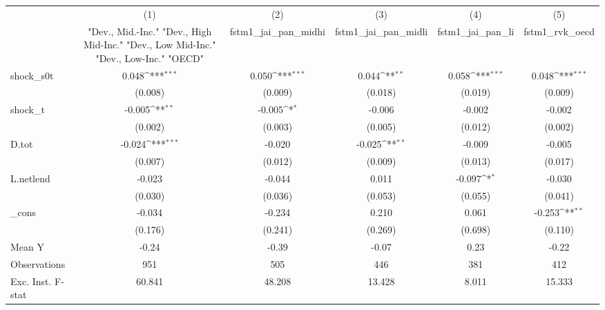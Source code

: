 {
\def\sym#1{\ifmmode^{#1}\else\(^{#1}\)\fi}
\begin{tabular}{l*{5}{c}}
\toprule
            &\multicolumn{1}{c}{(1)}&\multicolumn{1}{c}{(2)}&\multicolumn{1}{c}{(3)}&\multicolumn{1}{c}{(4)}&\multicolumn{1}{c}{(5)}\\
            &\multicolumn{1}{c}{ "Dev., Mid.-Inc." "Dev., High Mid-Inc." "Dev., Low Mid-Inc." "Dev., Low-Inc." "OECD" }&\multicolumn{1}{c}{fstm1\_jai\_pan\_midhi}&\multicolumn{1}{c}{fstm1\_jai\_pan\_midli}&\multicolumn{1}{c}{fstm1\_jai\_pan\_li}&\multicolumn{1}{c}{fstm1\_rvk\_oecd}\\
\midrule
shock\_s0t   &       0.048\sym{***}&       0.050\sym{***}&       0.044\sym{**} &       0.058\sym{***}&       0.048\sym{***}\\
            &     (0.008)         &     (0.009)         &     (0.018)         &     (0.019)         &     (0.009)         \\
\addlinespace
shock\_t     &      -0.005\sym{**} &      -0.005\sym{*}  &      -0.006         &      -0.002         &      -0.002         \\
            &     (0.002)         &     (0.003)         &     (0.005)         &     (0.012)         &     (0.002)         \\
\addlinespace
D.tot       &      -0.024\sym{***}&      -0.020         &      -0.025\sym{**} &      -0.009         &      -0.005         \\
            &     (0.007)         &     (0.012)         &     (0.009)         &     (0.013)         &     (0.017)         \\
\addlinespace
L.netlend   &      -0.023         &      -0.044         &       0.011         &      -0.097\sym{*}  &      -0.030         \\
            &     (0.030)         &     (0.036)         &     (0.053)         &     (0.055)         &     (0.041)         \\
\addlinespace
\_cons      &      -0.034         &      -0.234         &       0.210         &       0.061         &      -0.253\sym{**} \\
            &     (0.176)         &     (0.241)         &     (0.269)         &     (0.698)         &     (0.110)         \\
\midrule
Mean Y      &       -0.24         &       -0.39         &       -0.07         &        0.23         &       -0.22         \\
Observations&         951         &         505         &         446         &         381         &         412         \\
Exc. Inst. F-stat&      60.841         &      48.208         &      13.428         &       8.011         &      15.333         \\
\bottomrule
\end{tabular}
}
